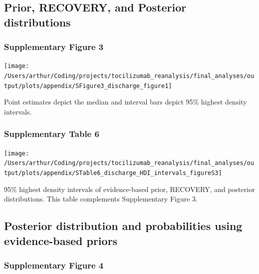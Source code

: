 \documentclass[
]{article}
\begin{document}
\hypertarget{prior-recovery-and-posterior-distributions-1}{%
\subsection{Prior, RECOVERY, and Posterior
distributions}\label{prior-recovery-and-posterior-distributions-1}}

\hypertarget{supplementary-figure-3}{%
\subsubsection{Supplementary Figure 3}\label{supplementary-figure-3}}

\begin{center}\texttt{[image: /Users/arthur/Coding/projects/tocilizumab\_reanalysis/final\_analyses/output/plots/appendix/SFigure3\_discharge\_figure1]} \end{center}

Point estimates depict the median and interval bars depict 95\% highest
density intervals.

\hypertarget{supplementary-table-6}{%
\subsubsection{Supplementary Table 6}\label{supplementary-table-6}}

\begin{center}\texttt{[image: /Users/arthur/Coding/projects/tocilizumab\_reanalysis/final\_analyses/output/plots/appendix/STable6\_discharge\_HDI\_intervals\_figureS3]} \end{center}

95\% highest density intervals of evidence-based prior, RECOVERY, and
posterior distributions. This table complements Supplementary Figure 3.

\newpage

\hypertarget{posterior-distribution-and-probabilities-using-evidence-based-priors}{%
\subsection{Posterior distribution and probabilities using
evidence-based
priors}\label{posterior-distribution-and-probabilities-using-evidence-based-priors}}

\hypertarget{supplementary-figure-4}{%
\subsubsection{Supplementary Figure 4}\label{supplementary-figure-4}}
\end{document}
